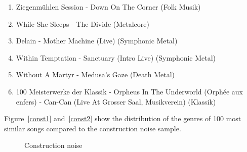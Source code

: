 \begin{enumerate}
	\setlength\itemsep{-0.5em}
	\item Ziegenm\"uhlen Session - Down On The Corner (Folk Musik)
	\item While She Sleeps - The Divide (Metalcore)
	\item Delain - Mother Machine (Live) (Symphonic Metal)
	\item Within Temptation - Sanctuary (Intro Live) (Symphonic Metal)
	\item Without A Martyr - Medusa's Gaze (Death Metal)
	\item 100 Meisterwerke der Klassik - Orpheus In The Underworld (Orph\'ee aux enfers) - Can-Can (Live At Grosser Saal, Musikverein) (Klassik)
\end{enumerate}

\noindent Figure~\ref{const1} and~\ref{const2} show the distribution of the genres of 100 most similar songs compared to the construction noise sample.  

\begin{figure}[htbp]
	\centering
	\caption{Construction noise}
	\label{fig:constn}
\end{figure}

